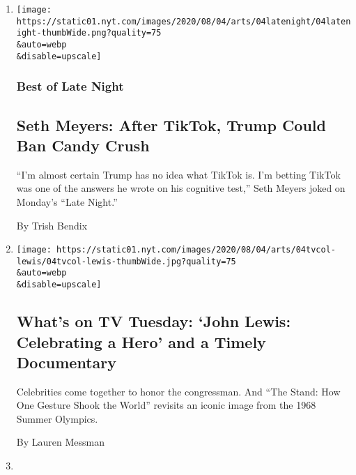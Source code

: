 \begin{enumerate}
\def\labelenumi{\arabic{enumi}.}
\item
  \href{/2020/08/04/arts/television/seth-meyers-tiktok-trump.html}{}

  \texttt{[image: https://static01.nyt.com/images/2020/08/04/arts/04latenight/04latenight-thumbWide.png?quality=75\\\&auto=webp\\\&disable=upscale]}

  \hypertarget{best-of-late-night}{%
  \subsubsection{Best of Late Night}\label{best-of-late-night}}

  \hypertarget{seth-meyers-after-tiktok-trump-could-ban-candy-crush}{%
  \subsection{Seth Meyers: After TikTok, Trump Could Ban Candy
  Crush}\label{seth-meyers-after-tiktok-trump-could-ban-candy-crush}}

  ``I'm almost certain Trump has no idea what TikTok is. I'm betting
  TikTok was one of the answers he wrote on his cognitive test,'' Seth
  Meyers joked on Monday's ``Late Night.''

  By Trish Bendix
\item
  \href{/2020/08/04/arts/television/whats-on-tv-tuesday.html}{}

  \texttt{[image: https://static01.nyt.com/images/2020/08/04/arts/04tvcol-lewis/04tvcol-lewis-thumbWide.jpg?quality=75\\\&auto=webp\\\&disable=upscale]}

  \hypertarget{whats-on-tv-tuesday-john-lewis-celebrating-a-hero-and-a-timely-documentary}{%
  \subsection{What's on TV Tuesday: `John Lewis: Celebrating a Hero' and
  a Timely
  Documentary}\label{whats-on-tv-tuesday-john-lewis-celebrating-a-hero-and-a-timely-documentary}}

  Celebrities come together to honor the congressman. And ``The Stand:
  How One Gesture Shook the World'' revisits an iconic image from the
  1968 Summer Olympics.

  By Lauren Messman
\item
  \href{/2020/08/03/arts/television/whats-on-tv-monday-immigration-nation-and-dora-and-the-lost-city-of-gold.html}{}


\end{enumerate}
